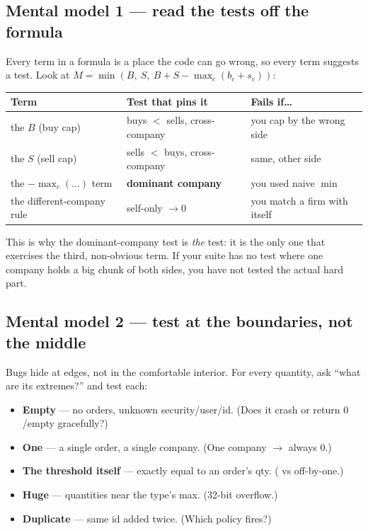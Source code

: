 \subsection{Mental model 1 --- read the tests off the formula}

Every term in a formula is a place the code can go wrong, so every term suggests a
test. Look at $M=\min(B,\ S,\ B+S-\max_c(b_c+s_c))$:

\begin{center}
\renewcommand{\arraystretch}{1.3}\footnotesize
\begin{tabular}{@{}p{3.2cm}p{5.3cm}p{5.0cm}@{}}
\toprule
\textbf{Term} & \textbf{Test that pins it} & \textbf{Fails if\dots} \\
\midrule
the $B$ (buy cap) & buys $<$ sells, cross-company & you cap by the wrong side \\
the $S$ (sell cap) & sells $<$ buys, cross-company & same, other side \\
the $-\max_c(\dots)$ term & \textbf{dominant company} & you used naive $\min$ \\
the different-company rule & self-only $\to 0$ & you match a firm with itself \\
\bottomrule
\end{tabular}
\end{center}

\begin{intu}
This is why the dominant-company test is \emph{the} test: it is the only one that
exercises the third, non-obvious term. If your suite has no test where one company
holds a big chunk of both sides, you have not tested the actual hard part.
\end{intu}

\subsection{Mental model 2 --- test at the boundaries, not the middle}

Bugs hide at edges, not in the comfortable interior. For every quantity, ask
``what are its extremes?'' and test each:

\begin{itemize}[leftmargin=1.5em,nosep]
  \item \textbf{Empty} --- no orders, unknown security/user/id. (Does it crash or
        return $0$/empty gracefully?)
  \item \textbf{One} --- a single order, a single company. (One company $\to$ always $0$.)
  \item \textbf{The threshold itself} ---  exactly equal to an order's
        qty. (\code{>} vs \code{>=} off-by-one.)
  \item \textbf{Huge} --- quantities near the type's max. (32-bit overflow.)
  \item \textbf{Duplicate} --- same id added twice. (Which policy fires?)
\end{itemize}

